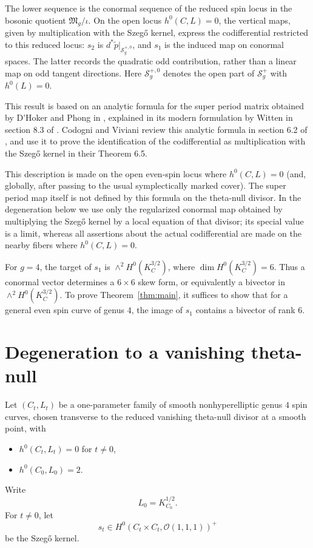 \documentclass[11pt]{article}
\newcommand{\OO}{\mathcal O}
\newcommand{\FM}{\mathfrak M}
\newcommand{\SSS}{\mathcal S}
\begin{document}
\begingroup
The lower sequence is the conormal sequence of the reduced spin locus
in the bosonic quotient $\FM_g/\iota$. On the open locus $h^0(C,L)=0$,
the vertical maps, given by multiplication with the Szeg\H{o} kernel,
express the codifferential restricted to this reduced locus:
$s_2$ is $d^*\widetilde p|_{\SSS_g^{+,0}}$, and $s_1$ is the induced
map on conormal spaces. The latter records the quadratic odd
contribution, rather than a linear map on odd tangent directions.
Here $\SSS_g^{+,0}$ denotes the open part of $\SSS_g^+$ with $h^0(L)=0$.
\endgroup


This result is based on an analytic formula for the super period matrix
obtained by D’Hoker and Phong in \cite{DP},
explained in its modern formulation by Witten in section 8.3 of \cite{W}.
Codogni and Viviani review this analytic formula in section 6.2 of \cite{CV},
and use it to prove the identification of the codifferential
as multiplication with the Szeg\H{o} kernel in their Theorem 6.5.

This description is made on the open even-spin locus where $h^0(C,L)=0$
(and, globally, after passing to the usual symplectically marked cover).
The super period map itself is not defined by this formula on the
theta-null divisor.  In the degeneration below we use only the
regularized conormal map obtained by multiplying the Szeg\H{o} kernel by
a local equation of that divisor; its special value is a limit, whereas
all assertions about the actual codifferential are made on the nearby
fibers where $h^0(C,L)=0$.




For $g=4$, the target of $s_1$ is
$\wedge^2 H^0(K_C^{3/2})$, where
$\dim H^0(K_C^{3/2})=6.$
Thus a conormal vector determines a $6\times6$ skew form, or equivalently a bivector in
$\wedge^2 H^0(K_C^{3/2})$.
To prove Theorem~\ref{thm:main}, it suffices to show that for a general {even} spin curve of genus $4$,
the image of $s_1$ contains a bivector of rank $6$.

\section{Degeneration to a vanishing theta-null}

Let $(C_t,L_t)$ be a one-parameter family of smooth {nonhyperelliptic} genus $4$ spin curves, chosen transverse to the {reduced} vanishing theta-null divisor {at a smooth point}, with
\begin{itemize}[leftmargin=2em]
\item $h^0(C_t,L_t)=0$ for $t\neq 0$,
\item $h^0(C_0,L_0)=2$.
\end{itemize}
Write
\[
L_0=K_{C_0}^{1/2}.
\]
For $t\neq 0$, let
\[
s_t\in {H^0(C_t\times C_t,\OO(1,1,1))^+}
\]
be the Szeg\H{o} kernel.
\end{document}
